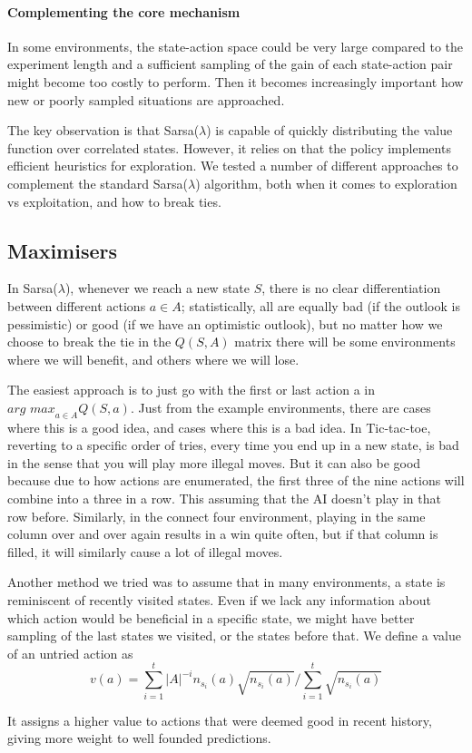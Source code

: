 \paragraph{Complementing the core mechanism}
In some environments, the state-action space could be very large compared to the
experiment length and a sufficient sampling of the gain of each state-action
pair might become too costly to perform. Then it becomes increasingly important
how new or poorly sampled situations are approached.

The key observation is that Sarsa($\lambda$) is capable of quickly distributing
the value function over correlated states. However, it relies on that the policy
implements efficient heuristics for exploration. We tested a number of different
approaches to complement the standard Sarsa($\lambda$) algorithm, both when it
comes to exploration vs exploitation, and how to break ties. 

\subsection{Maximisers}
In Sarsa($\lambda$), whenever we reach a new state $S$, there is no clear
differentiation between different actions $a \in A$; statistically, all are
equally bad (if the outlook is pessimistic) or good (if we have an optimistic
outlook), but no matter how we choose to break the tie in the $Q(S,A)$ matrix
there will be some environments where we will benefit, and others where we will
lose.

The easiest approach is to just go with the first or last action a in
$\textit{arg max}_{a \in A} Q(S,a)$. Just from the example environments, there
are cases where this is a good idea, and cases where this is a bad idea. In
Tic-tac-toe, reverting to a specific order of tries, every time you end up in a
new state, is bad in the sense that you will play more illegal moves. But it can
also be good because due to how actions are enumerated, the first three of the
nine actions will combine into a three in a row. This assuming that the AI
doesn't play in that row before. Similarly, in the connect four environment,
playing in the same column over and over again results in a win quite often, but
if that column is filled, it will similarly cause a lot of illegal moves.

Another method we tried was to assume that in many environments, a state is
reminiscent of recently visited states. Even if we lack any information about
which action would be beneficial in a specific state, we might have better
sampling of the last states we visited, or the states before that. We define a
value of an untried action as
\begin{equation}
    v(a) = \sum_{i=1}^{t} \vert{A}\vert^{-i} n_{s_i}(a)
    \sqrt{n_{s_i}(a)}\Big/\sum_{i=1}^{t} \sqrt{n_{s_i}(a)}
\end{equation}

It assigns a higher value to actions that were deemed good in recent history,
giving more weight to well founded predictions.
